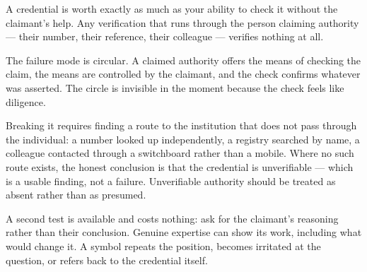 


\begin{core}
A credential is worth exactly as much as your ability to check it without the claimant's help. Any verification that runs through the person claiming authority --- their number, their reference, their colleague --- verifies nothing at all.
\end{core}

\begin{mechanism}
The failure mode is circular. A claimed authority offers the means of checking the claim, the means are controlled by the claimant, and the check confirms whatever was asserted. The circle is invisible in the moment because the check feels like diligence.

Breaking it requires finding a route to the institution that does not pass through the individual: a number looked up independently, a registry searched by name, a colleague contacted through a switchboard rather than a mobile. Where no such route exists, the honest conclusion is that the credential is unverifiable --- which is a usable finding, not a failure. Unverifiable authority should be treated as absent rather than as presumed.

A second test is available and costs nothing: ask for the claimant's reasoning rather than their conclusion. Genuine expertise can show its work, including what would change it. A symbol repeats the position, becomes irritated at the question, or refers back to the credential itself.
\end{mechanism}

